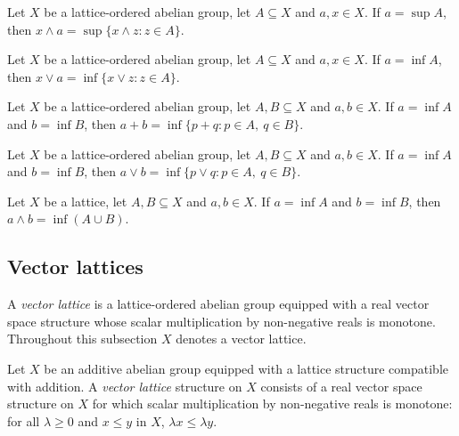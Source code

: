 \begin{lemma}
\label{lem:isLUB-inf-const}
\leanok
{}
Let $X$ be a lattice-ordered abelian group, let $A \subseteq X$ and
$a, x \in X$. If $a = \sup A$, then
$x \wedge a = \sup \{x \wedge z : z \in A\}$.
\end{lemma}

\begin{lemma}
\label{lem:isGLB-sup-const}
\leanok
{}
Let $X$ be a lattice-ordered abelian group, let $A \subseteq X$ and
$a, x \in X$. If $a = \inf A$, then
$x \vee a = \inf \{x \vee z : z \in A\}$.
\end{lemma}

\begin{lemma}
\label{lem:isGLB-add-sets}
\leanok
Let $X$ be a lattice-ordered abelian group, let $A, B \subseteq X$ and
$a, b \in X$. If $a = \inf A$ and $b = \inf B$, then
$a + b = \inf \{p + q : p \in A,\ q \in B\}$.
\end{lemma}

\begin{lemma}
\label{lem:isGLB-sup-sets}
\leanok
{}
Let $X$ be a lattice-ordered abelian group, let $A, B \subseteq X$ and
$a, b \in X$. If $a = \inf A$ and $b = \inf B$, then
$a \vee b = \inf \{p \vee q : p \in A,\ q \in B\}$.
\end{lemma}

\begin{lemma}
\label{lem:isGLB-union}
\leanok
Let $X$ be a lattice, let $A, B \subseteq X$ and $a, b \in X$. If
$a = \inf A$ and $b = \inf B$, then $a \wedge b = \inf (A \cup B)$.
\end{lemma}

\subsection{Vector lattices}

A \emph{vector lattice} is a lattice-ordered abelian group equipped with
a real vector space structure whose scalar multiplication by non-negative
reals is monotone. Throughout this subsection $X$ denotes a vector
lattice.

\begin{definition}
\label{def:vector-lattice}
\leanok
Let $X$ be an additive abelian group equipped with a lattice structure
compatible with addition. A \emph{vector lattice} structure on $X$
consists of a real vector space structure on $X$ for which scalar
multiplication by non-negative reals is monotone: for all $\lambda \ge 0$
and $x \le y$ in $X$, $\lambda x \le \lambda y$.
\end{definition}

